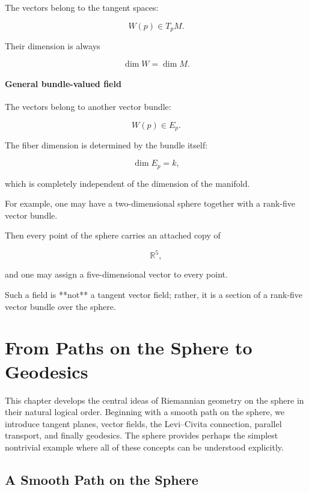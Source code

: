 \documentclass[12pt,a4paper]{article}
\theoremstyle{notespace}
\begin{document}
The vectors belong to the tangent spaces:

\[
\boxed{
	W(p)\in T_pM.
}
\]

Their dimension is always

\[
\boxed{
	\dim W=\dim M.
}
\]


\paragraph{General bundle-valued field}

The vectors belong to another vector bundle:

\[
\boxed{
	W(p)\in E_p.
}
\]

The fiber dimension is determined by the bundle itself:

\[
\boxed{
	\dim E_p=k,
}
\]

which is completely independent of the dimension of the manifold.

For example, one may have a two-dimensional sphere together with a
rank-five vector bundle.

Then every point of the sphere carries an attached copy of

\[
\mathbb R^5,
\]

and one may assign a five-dimensional vector to every point.

Such a field is **not** a tangent vector field; rather, it is a section
of a rank-five vector bundle over the sphere.


\section{From Paths on the Sphere to Geodesics}

This chapter develops the central ideas of Riemannian geometry on the sphere in their
natural logical order. Beginning with a smooth path on the sphere, we introduce tangent
planes, vector fields, the Levi--Civita connection, parallel transport, and finally geodesics.
The sphere provides perhaps the simplest nontrivial example where all of these concepts
can be understood explicitly.

\subsection{A Smooth Path on the Sphere}
\end{document}

